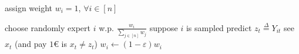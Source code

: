 \begin{algorithm}
    \caption{$\text{Randomized Weighted Majority}_\varepsilon$}\label{alg:rand_weight_maj}
    \begin{algorithmic}%
            \State assign weight $w_i = 1$, $\forall i \in [n]$

                \State choose randomly expert $i$ w.p. $\frac{w_i}{\sum_{j \in [n]} w_j}$
                \State suppose $i$ is sampled
                \State predict $z_t \overset{\Delta}{=} Y_{it}$
                \State see $x_t$ (and pay $1$€ is $x_t \neq z_t$)
                        \State $w_i \gets (1 - \varepsilon) w_i$
                    \EndIf
                \EndFor
            \EndFor
    \end{algorithmic}
\end{algorithm}